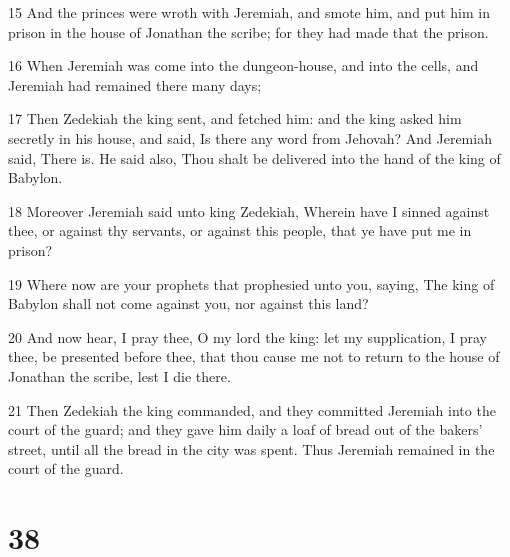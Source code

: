 \par 15 And the princes were wroth with Jeremiah, and smote him, and put him in prison in the house of Jonathan the scribe; for they had made that the prison.
\par 16 When Jeremiah was come into the dungeon-house, and into the cells, and Jeremiah had remained there many days;
\par 17 Then Zedekiah the king sent, and fetched him: and the king asked him secretly in his house, and said, Is there any word from Jehovah? And Jeremiah said, There is. He said also, Thou shalt be delivered into the hand of the king of Babylon.
\par 18 Moreover Jeremiah said unto king Zedekiah, Wherein have I sinned against thee, or against thy servants, or against this people, that ye have put me in prison?
\par 19 Where now are your prophets that prophesied unto you, saying, The king of Babylon shall not come against you, nor against this land?
\par 20 And now hear, I pray thee, O my lord the king: let my supplication, I pray thee, be presented before thee, that thou cause me not to return to the house of Jonathan the scribe, lest I die there.
\par 21 Then Zedekiah the king commanded, and they committed Jeremiah into the court of the guard; and they gave him daily a loaf of bread out of the bakers' street, until all the bread in the city was spent. Thus Jeremiah remained in the court of the guard.

\chapter{38}


